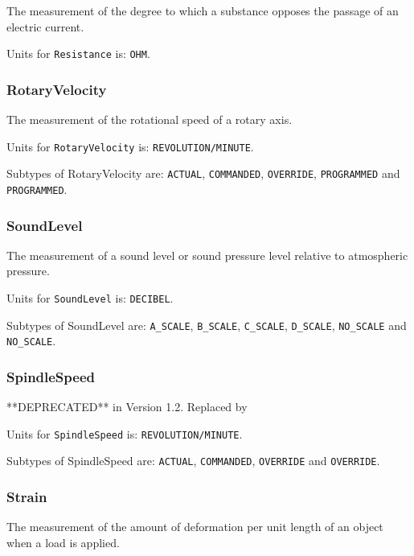 The measurement of the degree to which a substance opposes the passage of an electric current.


Units for \texttt{Resistance} is: \texttt{OHM}.

\FloatBarrier

\subsubsection{RotaryVelocity}
  \label{sec:RotaryVelocity}


The measurement of the rotational speed of a rotary axis.


Units for \texttt{RotaryVelocity} is: \texttt{REVOLUTION/MINUTE}.


Subtypes of RotaryVelocity are: \texttt{ACTUAL}, \texttt{COMMANDED}, \texttt{OVERRIDE}, \texttt{PROGRAMMED} and \texttt{PROGRAMMED}. 
\FloatBarrier

\subsubsection{SoundLevel}
  \label{sec:SoundLevel}


The measurement of a sound level or sound pressure level relative to atmospheric pressure.


Units for \texttt{SoundLevel} is: \texttt{DECIBEL}.


Subtypes of SoundLevel are: \texttt{A_SCALE}, \texttt{B_SCALE}, \texttt{C_SCALE}, \texttt{D_SCALE}, \texttt{NO_SCALE} and \texttt{NO_SCALE}. 
\FloatBarrier

\subsubsection{SpindleSpeed}
  \label{sec:SpindleSpeed}


**DEPRECATED** in Version 1.2.  Replaced by 


Units for \texttt{SpindleSpeed} is: \texttt{REVOLUTION/MINUTE}.


Subtypes of SpindleSpeed are: \texttt{ACTUAL}, \texttt{COMMANDED}, \texttt{OVERRIDE} and \texttt{OVERRIDE}. 
\FloatBarrier

\subsubsection{Strain}
  \label{sec:Strain}


The measurement of the amount of deformation per unit length of an object when a load is applied.


